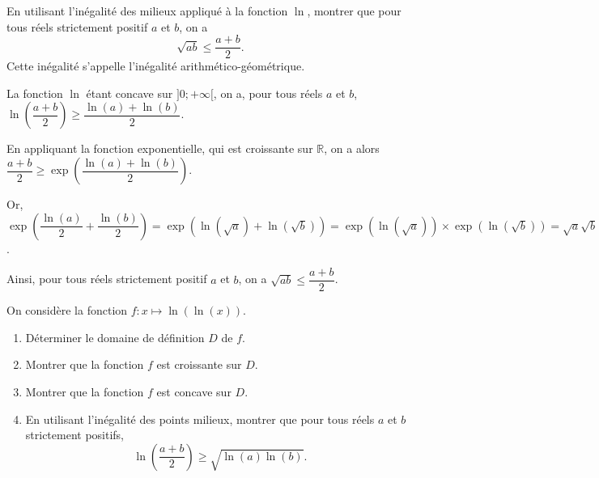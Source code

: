 \documentclass[11pt,fleqn, openany]{book} %
\begin{document}
\begin{exercise}[topic=cvx03]En utilisant l'inégalité des milieux appliqué à la fonction $\ln$, montrer que pour tous réels strictement positif $a$ et $b$, on a
\[ \sqrt{ab} \leqslant \dfrac{a+b}{2}.\]
Cette inégalité s'appelle l'inégalité arithmético-géométrique.\end{exercise}

\begin{solution}La fonction $\ln$ étant concave sur $]0;+\infty[$, on a, pour tous réels $a$ et $b$, $\ln\left(\dfrac{a+b}{2}\right)\geqslant \dfrac{\ln(a)+\ln(b)}{2}$. 

En appliquant la fonction exponentielle, qui est croissante sur $\mathbb{R}$, on a alors $\dfrac{a+b}{2}\geqslant \exp \left(\dfrac{\ln(a)+\ln(b)}{2}\right)$.

Or, $\exp\left(\dfrac{\ln(a)}{2}+\dfrac{\ln(b)}{2}\right)=\exp(\ln(\sqrt{a})+\ln(\sqrt{b}))=\exp(\ln(\sqrt{a}))\times \exp(\ln(\sqrt{b})) = \sqrt{a}\sqrt{b}=\sqrt{ab}$.

Ainsi, pour tous réels strictement positif $a$ et $b$, on a $\sqrt{ab} \leqslant \dfrac{a+b}{2}$.
\end{solution}



\begin{exercise}[topic=cvx03]On considère la fonction $f : x \mapsto \ln( \ln(x))$.
\begin{enumerate}
\item Déterminer le domaine de définition $D$ de $f$.
\item Montrer que la fonction $f$ est croissante sur $D$.
\item Montrer que la fonction $f$ est concave sur $D$.
\item En utilisant l'inégalité des points milieux, montrer que pour tous réels $a$ et $b$ strictement positifs,
\[ \ln \left( \dfrac{a+b}{2}\right) \geqslant \sqrt{\ln(a) \ln(b)}.\]
\end{enumerate}\end{exercise}
\end{document}
